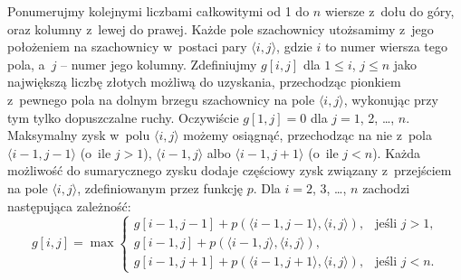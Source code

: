 Ponumerujmy kolejnymi liczbami całkowitymi od 1 do $n$ wiersze z~dołu do góry, oraz kolumny z~lewej do prawej.
Każde pole szachownicy utożsamimy z~jego położeniem na szachownicy w~postaci pary $\langle i,j\rangle$, gdzie $i$ to numer wiersza tego pola, a~$j$ -- numer jego kolumny.
Zdefiniujmy $g[i,j]$ dla $1\le i$, $j\le n$ jako największą liczbę złotych możliwą do uzyskania, przechodząc pionkiem z~pewnego pola na dolnym brzegu szachownicy na pole $\langle i,j\rangle$, wykonując przy tym tylko dopuszczalne ruchy.
Oczywiście $g[1,j]=0$ dla $j=1$, 2, \dots, $n$.
Maksymalny zysk w~polu $\langle i,j\rangle$ możemy osiągnąć, przechodząc na nie z~pola $\langle i-1,j-1\rangle$ (o~ile $j>1$), $\langle i-1,j\rangle$ albo $\langle i-1,j+1\rangle$ (o~ile $j<n$).
Każda możliwość do sumarycznego zysku dodaje częściowy zysk związany z~przejściem na pole $\langle i,j\rangle$, zdefiniowanym przez funkcję $p$.
Dla $i=2$, 3, \dots, $n$ zachodzi następująca zależność:
\[
	g[i,j] = \max\begin{cases}
		g[i-1,j-1]+p(\langle i-1,j-1\rangle,\langle i,j\rangle), & \text{jeśli $j>1$,} \\
		g[i-1,j]+p(\langle i-1,j\rangle,\langle i,j\rangle), & \\
		g[i-1,j+1]+p(\langle i-1,j+1\rangle,\langle i,j\rangle), & \text{jeśli $j<n$.}
	\end{cases}
\]

